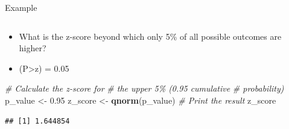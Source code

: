 \documentclass[
  ignorenonframetext,
]{beamer}
\newenvironment{Shaded}{\begin{snugshade}}{\end{snugshade}}
\newcommand{\CommentTok}[1]{\textcolor[rgb]{0.56,0.35,0.01}{\textit{#1}}}
\newcommand{\FloatTok}[1]{\textcolor[rgb]{0.00,0.00,0.81}{#1}}
\newcommand{\FunctionTok}[1]{\textcolor[rgb]{0.13,0.29,0.53}{\textbf{#1}}}
\newcommand{\NormalTok}[1]{#1}
\newcommand{\OtherTok}[1]{\textcolor[rgb]{0.56,0.35,0.01}{#1}}
\providecommand{\tightlist}{%
  \setlength{\itemsep}{0pt}\setlength{\parskip}{0pt}}
\begin{document}
\begin{frame}[fragile]{Example}
\label{example-4}
\begin{columns}[T]
\begin{column}{0.5\textwidth}
\vspace{1.5cm}

\begin{itemize}
\tightlist
\item
  What is the z-score beyond which only 5\% of all possible outcomes are
  higher?
\end{itemize}

\begin{itemize}
\tightlist
\item
  (P\textgreater z) = 0.05
\end{itemize}

\begin{Shaded}
\begin{Highlighting}[]
\CommentTok{\# Calculate the z{-}score for }
\CommentTok{\# the upper 5\% (0.95 cumulative }
\CommentTok{\# probability)}
\NormalTok{p\_value }\OtherTok{\textless{}{-}} \FloatTok{0.95}
\NormalTok{z\_score }\OtherTok{\textless{}{-}} \FunctionTok{qnorm}\NormalTok{(p\_value)}
\CommentTok{\# Print the result}
\NormalTok{z\_score}
\end{Highlighting}
\end{Shaded}

\begin{verbatim}
## [1] 1.644854
\end{verbatim}
\end{column}

\begin{column}{0.5\textwidth}
\vspace{1cm}


\end{column}
\end{columns}
\end{frame}
\end{document}
